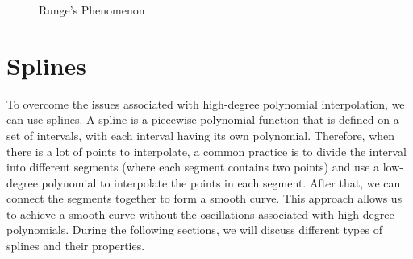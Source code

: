 \begin{figure}
    \centering
    \caption{Runge's Phenomenon}
    \label{fig:runge}
\end{figure}


\section{Splines}

To overcome the issues associated with high-degree polynomial interpolation, we can use splines. A spline is a piecewise polynomial function that is defined on a set of intervals, with each interval having its own polynomial. Therefore, when there is a lot of points to interpolate, a common practice is to divide the interval into different segments (where each segment contains two points) and use a low-degree polynomial to interpolate the points in each segment. After that, we can connect the segments together to form a smooth curve. This approach allows us to achieve a smooth curve without the oscillations associated with high-degree polynomials. During the following sections, we will discuss different types of splines and their properties.

